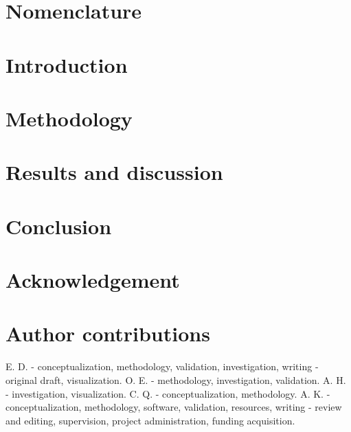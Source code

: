 \documentclass[12pt,authoryear]{elsarticle}
\begin{document}
\renewcommand{\thefootnote}{\textit{\alph{footnote}}}


\section*{Nomenclature}


\section{Introduction}


\section{Methodology}


\section{Results and discussion}


\section{Conclusion}


\section*{Acknowledgement}


\section*{Author contributions}
E. D. - conceptualization, methodology, validation, investigation, writing - original draft, visualization. O. E. - methodology, investigation, validation. A. H. - investigation, visualization. C. Q. - conceptualization, methodology. A. K. - conceptualization, methodology, software, validation, resources, writing - review and editing, supervision, project administration, funding acquisition.


 






\end{document}
